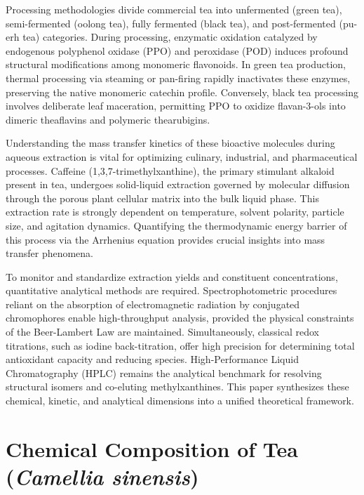 \documentclass[11pt,a4paper]{article}
\begin{document}
Processing methodologies divide commercial tea into unfermented (green tea), semi-fermented (oolong tea), fully fermented (black tea), and post-fermented (pu-erh tea) categories. During processing, enzymatic oxidation catalyzed by endogenous polyphenol oxidase (PPO) and peroxidase (POD) induces profound structural modifications among monomeric flavonoids. In green tea production, thermal processing via steaming or pan-firing rapidly inactivates these enzymes, preserving the native monomeric catechin profile. Conversely, black tea processing involves deliberate leaf maceration, permitting PPO to oxidize flavan-3-ols into dimeric theaflavins and polymeric thearubigins.

Understanding the mass transfer kinetics of these bioactive molecules during aqueous extraction is vital for optimizing culinary, industrial, and pharmaceutical processes. Caffeine (1,3,7-trimethylxanthine), the primary stimulant alkaloid present in tea, undergoes solid-liquid extraction governed by molecular diffusion through the porous plant cellular matrix into the bulk liquid phase. This extraction rate is strongly dependent on temperature, solvent polarity, particle size, and agitation dynamics. Quantifying the thermodynamic energy barrier of this process via the Arrhenius equation provides crucial insights into mass transfer phenomena.

To monitor and standardize extraction yields and constituent concentrations, quantitative analytical methods are required. Spectrophotometric procedures reliant on the absorption of electromagnetic radiation by conjugated chromophores enable high-throughput analysis, provided the physical constraints of the Beer-Lambert Law are maintained. Simultaneously, classical redox titrations, such as iodine back-titration, offer high precision for determining total antioxidant capacity and reducing species. High-Performance Liquid Chromatography (HPLC) remains the analytical benchmark for resolving structural isomers and co-eluting methylxanthines. This paper synthesizes these chemical, kinetic, and analytical dimensions into a unified theoretical framework.

\section{Chemical Composition of Tea (\textit{Camellia sinensis})}
\end{document}
